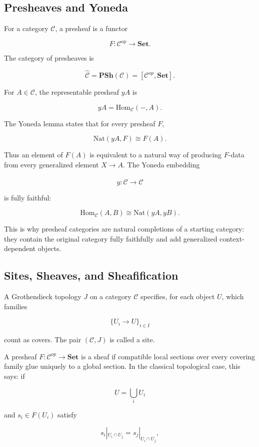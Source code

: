 \documentclass[11pt]{article}
\begin{document}
\subsection{Presheaves and Yoneda}

For a category \(\mathcal{C}\), a presheaf is a functor


\[
F:\mathcal{C}^{op}\to\mathbf{Set}.
\]

The category of presheaves is


\[
\widehat{\mathcal{C}}
=\mathbf{PSh}(\mathcal{C})
=[\mathcal{C}^{op},\mathbf{Set}].
\]

For \(A\in\mathcal{C}\), the representable presheaf \(yA\) is


\[
yA=\mathrm{Hom}_{\mathcal{C}}(-,A).
\]

The Yoneda lemma states that for every presheaf \(F\),


\[
\mathrm{Nat}(yA,F)\cong F(A).
\]

Thus an element of \(F(A)\) is equivalent to a natural way of producing \(F\)-data from every generalized element \(X\to A\). The Yoneda embedding


\[
y:\mathcal{C}\to\widehat{\mathcal{C}}
\]

is fully faithful:


\[
\mathrm{Hom}_{\mathcal{C}}(A,B)
\cong
\mathrm{Nat}(yA,yB).
\]

This is why presheaf categories are natural completions of a starting category: they contain the original category fully faithfully and add generalized context-dependent objects.


\subsection{Sites, Sheaves, and Sheafification}

A Grothendieck topology \(J\) on a category \(\mathcal{C}\) specifies, for each object \(U\), which families


\[
\{U_i\to U\}_{i\in I}
\]

count as covers. The pair \((\mathcal{C},J)\) is called a site.


A presheaf \(F:\mathcal{C}^{op}\to\mathbf{Set}\) is a sheaf if compatible local sections over every covering family glue uniquely to a global section. In the classical topological case, this says: if


\[
U=\bigcup_i U_i
\]

and \(s_i\in F(U_i)\) satisfy


\[
s_i|_{U_i\cap U_j}=s_j|_{U_i\cap U_j},
\]
\end{document}
